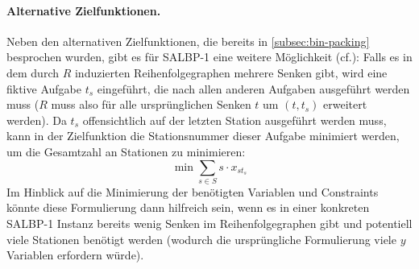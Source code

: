 \paragraph{Alternative Zielfunktionen.}
Neben den alternativen Zielfunktionen, die bereits in \cref{subsec:bin-packing} besprochen wurden,
gibt es für SALBP-1 eine weitere Möglichkeit (cf.\cite{patterson1975assembly}):
Falls es in dem durch $R$ induzierten Reihenfolgegraphen mehrere Senken gibt,
wird eine fiktive Aufgabe $t_s$ eingeführt, die nach allen anderen Aufgaben ausgeführt werden muss
($R$ muss also für alle ursprünglichen Senken $t$ um $(t,t_s)$ erweitert werden).
Da $t_s$ offensichtlich auf der letzten Station ausgeführt werden muss,
kann in der Zielfunktion die Stationsnummer dieser Aufgabe minimiert werden, um die Gesamtzahl an
Stationen zu minimieren:
\[
    \min \sum_{s\in S} s \cdot x_{st_s}
\]
Im Hinblick auf die Minimierung der benötigten Variablen und Constraints könnte diese Formulierung dann hilfreich sein,
wenn es in einer konkreten SALBP-1 Instanz bereits wenig Senken im Reihenfolgegraphen gibt
und potentiell viele Stationen benötigt werden (wodurch die ursprüngliche Formulierung viele $y$ Variablen erfordern würde).